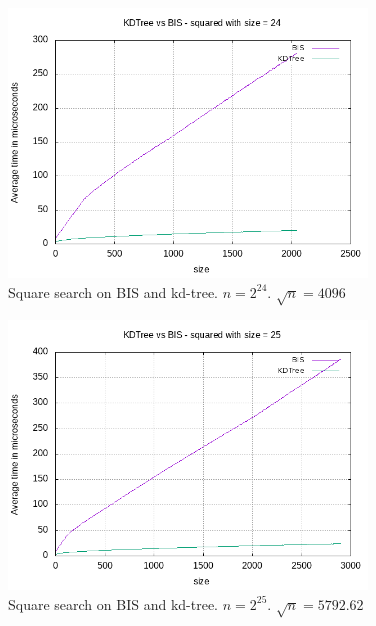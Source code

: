 \begin{figure}[h]
    \centering
    \includegraphics[width = 0.85\textwidth]{pictures/analysis/sqrt_24.png}
    \caption{Square search on BIS and kd-tree. $n=2^{24}$. $\sqrt{n} = 4096$}\label{fig:sqrt_24}
\end{figure}

\begin{figure}[h]
    \centering
    \includegraphics[width = 0.85\textwidth]{pictures/analysis/sqrt_25.png}
    \caption{Square search on BIS and kd-tree. $n=2^{25}$. $\sqrt{n} = 5792.62$}\label{fig:sqrt_25}
\end{figure}


